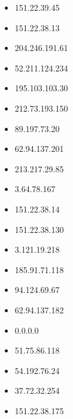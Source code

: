 \documentclass{article}
\begin{document}
\begin{itemize}
    
        
            \item 151.22.39.45
        
            \item 151.22.38.13
        
            \item 204.246.191.61
        
            \item 52.211.124.234
        
            \item 195.103.103.30
        
            \item 212.73.193.150
        
            \item 89.197.73.20
        
            \item 62.94.137.201
        
            \item 213.217.29.85
        
            \item 3.64.78.167
        
            \item 151.22.38.14
        
            \item 151.22.38.130
        
            \item 3.121.19.218
        
            \item 185.91.71.118
        
            \item 94.124.69.67
        
            \item 62.94.137.182
        
            \item 0.0.0.0
        
            \item 51.75.86.118
        
            \item 54.192.76.24
        
            \item 37.72.32.254
        
            \item 151.22.38.175
        

\end{itemize}
\end{document}
